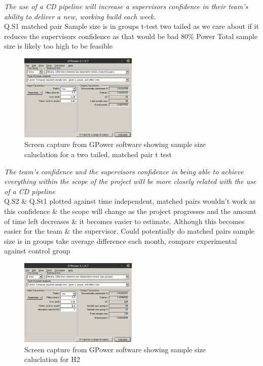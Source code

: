 \documentclass[lettersize,journal]{IEEEtran}
\begin{document}
        \textit{The use of a CD pipeline will increase a supervisors confidence in their team's ability to deliver a new, working build each week.} \\
            Q.S1
            matched pair
            Sample size is in groups
            t-test
            two tailed as we care about if it reduces the supervisors confidence as that would be bad
            80\% Power
            Total sample size is likely too high to be feasible
            \begin{figure}[h!]
                \includegraphics[width=0.5\textwidth]{Images/GPower_Matched.png}
                \caption{Screen capture from GPower software showing sample size caluclation for a two tailed, matched pair t test}
                \label{twotailmatchedpair}
            \end{figure}

        \textit{The team's confidence and the supervisors confidence in being able to achieve everything within the scope of the project will be more closely related with the use of a CD pipeline} \\
            Q.S2 \& Q.St1 plotted against time
            independent, matched pairs wouldn't work as this confidence \& the scope will change as the project progresses and the amount of time left decreases \& it becomes easier to estimate. Although this becomes easier for the team \& the supervisor.
            Could potentially do matched pairs
            sample size is in groups
            take average difference each month, compare experimental against control group
            \begin{figure}[h!]
                \includegraphics[width=0.5\textwidth]{Images/GPower_Independent.png}
                \caption{Screen capture from GPower software showing sample size caluclation for H2}
                \label{twotailindependent}
            \end{figure}
\end{document}

